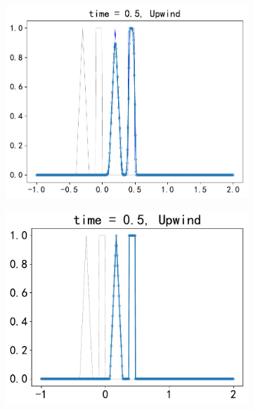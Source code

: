 \documentclass[10.5pt
]{article}
\begin{document}
\begin{figure}
\begin{subfigure}{.48\linewidth}
  \caption{}
  \label{fig:problem1-2}
\end{subfigure}
\begin{subfigure}{.48\linewidth}
  \includegraphics[width=\textwidth]{figures/problem1_upwind0.95.pdf}
  \caption{}
  \label{fig:problem1-3}
\end{subfigure}
\hfill
\begin{subfigure}{.48\linewidth}
  \includegraphics[width=\textwidth]{figures/problem1_upwind1.0.pdf}
  \caption{}
  \label{fig:problem1-4}
\end{subfigure}
\begin{subfigure}{.48\linewidth}

\end{subfigure}
\end{figure}
\end{document}
